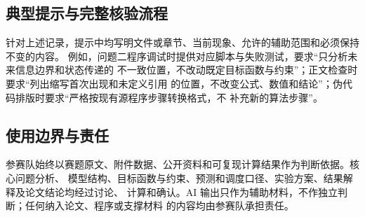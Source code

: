 \documentclass[withoutpreface,bwprint]{cumcmthesis}
\begin{document}
\subsection{典型提示与完整核验流程}

针对上述记录，提示中均写明文件或章节、当前现象、允许的辅助范围和必须保持不变的内容。
例如，问题二程序调试时提供对应脚本与失败测试，要求“只分析未来信息边界和状态传递的
不一致位置，不改动既定目标函数与约束”；正文检查时要求“列出缩写首次出现和未定义引用
的位置，不改变公式、数值和结论”；伪代码排版时要求“严格按现有源程序步骤转换格式，不
补充新的算法步骤”。

\subsection{使用边界与责任}

参赛队始终以赛题原文、附件数据、公开资料和可复现计算结果作为判断依据。核心问题分析、
模型结构、目标函数与约束、预测和调度口径、实验方案、结果解释及论文结论均经过讨论、
计算和确认。AI 输出只作为辅助材料，不作独立判断；任何纳入论文、程序或支撑材料
的内容均由参赛队承担责任。
\end{document}
